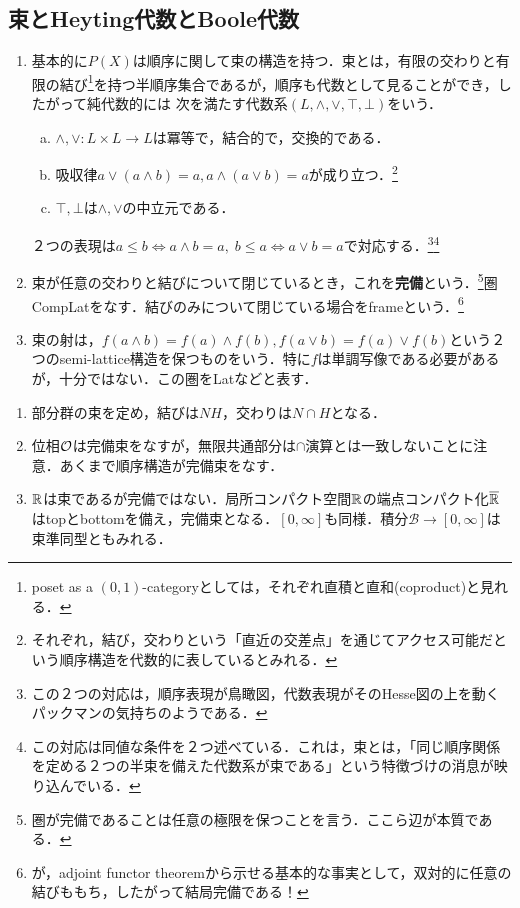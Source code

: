 \documentclass[uplatex, dvipdfmx]{jsreport}
\renewcommand{\B}{\mathcal{B}}
\begin{document}
\subsection{束とHeyting代数とBoole代数}

\begin{definition}\mbox{}
    \begin{enumerate}
        \item 
    基本的に$P(X)$は順序に関して束の構造を持つ．束とは，有限の交わりと有限の結び\footnote{poset as a $(0,1)$-categoryとしては，それぞれ直積と直和(coproduct)と見れる．}を持つ半順序集合であるが，順序も代数として見ることができ，したがって純代数的には
    次を満たす代数系$(L,\land,\lor,\top,\bot)$をいう．
    \begin{enumerate}[(a)]
        \item $\land,\lor:L\times L\to L$は冪等で，結合的で，交換的である．
        \item 吸収律$a\lor(a\land b)=a,a\land(a\lor b)=a$が成り立つ．\footnote{それぞれ，結び，交わりという「直近の交差点」を通じてアクセス可能だという順序構造を代数的に表しているとみれる．}
        \item $\top,\bot$は$\land,\lor$の中立元である．
    \end{enumerate}
    ２つの表現は$a\le b\Leftrightarrow a\land b=a,\;b\le a\Leftrightarrow a\lor b=a$で対応する．\footnote{この２つの対応は，順序表現が鳥瞰図，代数表現がそのHesse図の上を動くパックマンの気持ちのようである．}\footnote{この対応は同値な条件を２つ述べている．これは，束とは，「同じ順序関係を定める２つの半束を備えた代数系が束である」という特徴づけの消息が映り込んでいる．}
    \item 束が任意の交わりと結びについて閉じているとき，これを\textbf{完備}という．\footnote{圏が完備であることは任意の極限を保つことを言う．ここら辺が本質である．}圏CompLatをなす．結びのみについて閉じている場合をframeという．\footnote{が，adjoint functor theoremから示せる基本的な事実として，双対的に任意の結びももち，したがって結局完備である！}
    \item 束の射は，$f(a\land b)=f(a)\land f(b),f(a\lor b)=f(a)\lor f(b)$という２つのsemi-lattice構造を保つものをいう．特に$f$は単調写像である必要があるが，十分ではない．この圏をLatなどと表す．
    \end{enumerate}
\end{definition}

\begin{example}[束と束準同型の例]\mbox{}\label{exp-lattice}
    \begin{enumerate}
        \item 部分群の束を定め，結びは$NH$，交わりは$N\cap H$となる．
        \item 位相$\mathcal{O}$は完備束をなすが，無限共通部分は$\cap$演算とは一致しないことに注意．あくまで順序構造が完備束をなす．
        \item $\mathbb{R}$は束であるが完備ではない．局所コンパクト空間$\mathbb{R}$の端点コンパクト化$\overline{\mathbb{R}}$はtopとbottomを備え，完備束となる．$[0,\infty]$も同様．積分$\B\to[0,\infty]$は束準同型ともみれる．
    \end{enumerate}
\end{example}
\end{document}
